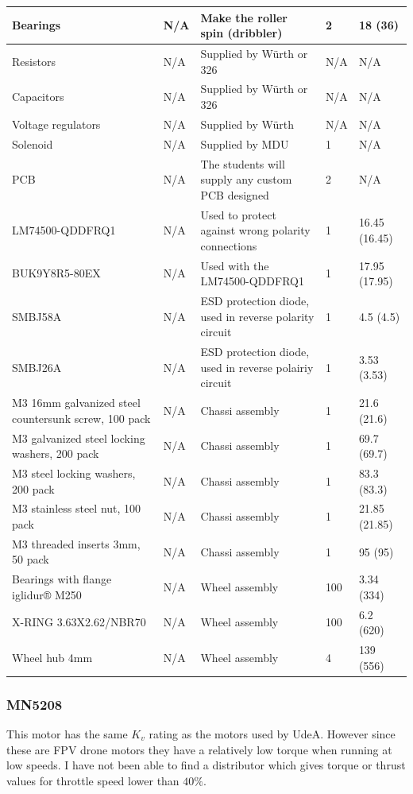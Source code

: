 \documentclass[a4paper,8pt]{article}
\begin{document}
\begin{small}
\begin{longtable}{|p{3cm}|p{3cm}|p{3cm}|p{1cm}|p{3cm}| }
      Bearings & N/A & Make the roller spin (dribbler) & 2 & 18 (36)\\ \hline
      Resistors & N/A & Supplied by Würth or 326 & N/A & N/A \\ \hline 
      Capacitors & N/A & Supplied by Würth or 326 & N/A & N/A \\ \hline 
      Voltage regulators & N/A & Supplied by Würth & N/A & N/A \\ \hline 
      Solenoid & N/A & Supplied by MDU & 1 & N/A \\ \hline 
      PCB & N/A & The students will supply any custom PCB designed & 2 & N/A\\ \hline 
      LM74500\break-QDDFRQ1 & N/A & Used to protect against wrong polarity connections & 1 & 16.45 (16.45) \\ \hline 
      BUK9Y8R5-80EX & N/A & Used with the LM74500\break-QDDFRQ1 & 1 & 17.95 (17.95) \\ \hline 
      SMBJ58A & N/A & ESD protection diode, used in reverse polarity circuit & 1 & 4.5 (4.5) \\ \hline 
      SMBJ26A & N/A & ESD protection diode, used in reverse polairiy circuit & 1 & 3.53 (3.53) \\ \hline
      M3 16mm galvanized steel countersunk screw, 100 pack & N/A & Chassi assembly & 1 & 21.6 (21.6) \\ \hline
      M3 galvanized steel locking washers, 200 pack & N/A & Chassi assembly & 1 & 69.7 (69.7) \\ \hline
      M3 steel locking washers, 200 pack & N/A & Chassi assembly & 1 & 83.3 (83.3) \\ \hline
      M3 stainless steel nut, 100 pack & N/A & Chassi assembly & 1 & 21.85 (21.85) \\ \hline
      M3 threaded inserts 3mm, 50 pack & N/A & Chassi assembly & 1 & 95 (95) \\ \hline
      Bearings with flange iglidur® M250 & N/A & Wheel assembly & 100 & 3.34 (334) \\ \hline
      X-RING 3.63X2.62/NBR70 & N/A & Wheel assembly & 100 & 6.2 (620) \\ \hline
      Wheel hub 4mm & N/A & Wheel assembly & 4 & 139 (556) \\ \hline
    \end{longtable}
  \end{small}
  \subsubsection{MN5208}

  This motor has the same \(K_v\) rating as the motors used by UdeA. However since these are FPV drone motors they have a relatively low torque when running at low speeds. I have not been able to find a distributor which gives torque or thrust values for throttle speed lower than \(40\%\).

   
\end{document}
